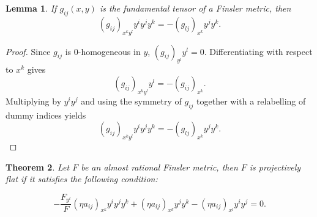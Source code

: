 \documentclass[12pt]{article}
\newtheorem{theorem}{Theorem}[section]
\newtheorem{lemma}[theorem]{Lemma}
\theoremstyle{definition}
\begin{document}
								\begin{lemma}\label{lem1}
									If $g_{ij}(x,y)$ is the fundamental tensor of a Finsler metric, then
									\[
									(g_{ij})_{x^k y^l}y^i y^j y^k
									=
									-(g_{lj})_{x^k}y^j y^k.
									\]
								\end{lemma}
								
								\begin{proof}
									Since $g_{ij}$ is $0$-homogeneous in $y$,
									$(g_{ij})_{y^l}y^l=0.$
									Differentiating with respect to $x^k$ gives
									\[
									(g_{ij})_{x^k y^l}y^l=-(g_{ij})_{x^k}.
									\]
									Multiplying by $y^i y^j$ and using the symmetry of $g_{ij}$ together with a relabelling of dummy indices yields
									\[
									(g_{ij})_{x^k y^l}y^i y^j y^k
									=
									-(g_{lj})_{x^k}y^j y^k.
									\]
								\end{proof}
								\begin{theorem}\label{4.2} Let $F$ be  an almost rational Finsler metric, then $F$ is
									projectively flat 
									if it satisfies the following condition:
									
									\begin{equation}\label{eq:PF_AR_reduced}
									-\frac{F_{y^l}}{F}
									(\eta a_{ij})_{x^k}y^iy^jy^k
									+
									(\eta a_{lj})_{x^k}y^jy^k
									-
									(\eta a_{ij})_{x^l}y^iy^j
									=0.
									\end{equation}
									
								\end{theorem}
								
\end{document}
